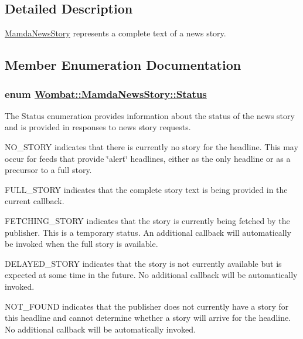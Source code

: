 \subsection{Detailed Description}
\hyperlink{classWombat_1_1MamdaNewsStory}{Mamda\-News\-Story} represents a complete text of a news story. 



\subsection{Member Enumeration Documentation}
\hypertarget{classWombat_1_1MamdaNewsStory_25ee81ce6b01be03a95ab954acdb1e6d}{
\subsubsection[Status]{\setlength{\rightskip}{0pt plus 5cm}enum \hyperlink{classWombat_1_1MamdaNewsStory_25ee81ce6b01be03a95ab954acdb1e6d}{Wombat::Mamda\-News\-Story::Status}}}
\label{classWombat_1_1MamdaNewsStory_25ee81ce6b01be03a95ab954acdb1e6d}


The Status enumeration provides information about the status of the news story and is provided in responses to news story requests. 

NO\_\-STORY indicates that there is currently no story for the headline. This may occur for feeds that provide \char`\"{}alert\char`\"{} headlines, either as the only headline or as a precursor to a full story.

FULL\_\-STORY indicates that the complete story text is being provided in the current callback.

FETCHING\_\-STORY indicates that the story is currently being fetched by the publisher. This is a temporary status. An additional callback will automatically be invoked when the full story is available.

DELAYED\_\-STORY indicates that the story is not currently available but is expected at some time in the future. No additional callback will be automatically invoked.

NOT\_\-FOUND indicates that the publisher does not currently have a story for this headline and cannot determine whether a story will arrive for the headline. No additional callback will be automatically invoked.

